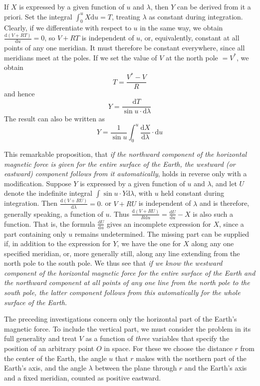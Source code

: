 If $X$ is expressed by a given function of $u$ and $\lambda$, then $Y$ can be derived from it a priori. Set the integral $\int_0^u X\mathrm{d}u=T$, treating $\lambda$ as constant during integration. Clearly, if we differentiate with respect to $u$ in the same way, we obtain $\frac{\mathrm{d}(V+RT)}{\mathrm{d}u}=0$, so $V+RT$ is independent of $u$, or, equivalently, constant at all points of any one meridian. It must therefore be constant everywhere, since all meridians meet at the poles. If we set the value of $V$ at the north pole $=V^*$, we obtain
\[
T=\frac{V^*-V}{R}
\]
and hence
\[
Y=\frac{\mathrm{d}T}{\sin u\cdot\mathrm{d}\lambda}
\]
The result can also be written as
\[
Y=\frac{1}{\sin u}\int_0^u\frac{\mathrm{d}X}{\mathrm{d}\lambda}\cdot\mathrm{d}u
\]

This remarkable proposition, that \textit{if the northward component of the horizontal magnetic force is given for the entire surface of the Earth, the westward (or eastward) component follows from it automatically}, holds in reverse only with a modification. Suppose $Y$ is expressed by a given function of $u$ and $\lambda$, and let $U$ denote the indefinite integral $\int\sin u\cdot Y\mathrm{d}\lambda$, with $u$ held constant during integration. Then $\frac{\mathrm{d}(V+RU)}{\mathrm{d}\lambda}=0$. or $V+RU$ is independent of $\lambda$ and is therefore, generally speaking, a function of $u$. Thus $\frac{\mathrm{d}(V+RU)}{R\mathrm{d}u}=\frac{\mathrm{d}U}{\mathrm{d}u}-X$ is also such a function. That is, the formula $\frac{\mathrm{d}U}{\mathrm{d}u}$ gives an incomplete expression for $X$, since a part containing only $u$ remains undetermined. The missing part can be supplied if, in addition to the expression for $Y$, we have the one for $X$ along any one specified meridian, or, more generally still, along any line extending from the north pole to the south pole. We thus see that \textit{if we know the westward component of the horizontal magnetic force for the entire surface of the Earth and the northward component at all points of any one line from the north pole to the south pole, the latter component follows from this automatically for the whole surface of the Earth.}

The preceding investigations concern only the horizontal part of the Earth's magnetic force. To include the vertical part, we must consider the problem in its full generality and treat $V$ as a function of \textit{three} variables that specify the position of an arbitrary point $O$ in space. For these we choose the distance $r$ from the center of the Earth, the angle $u$ that $r$ makes with the northern part of the Earth's axis, and the angle $\lambda$ between the plane through $r$ and the Earth's axis and a fixed meridian, counted as positive eastward.

